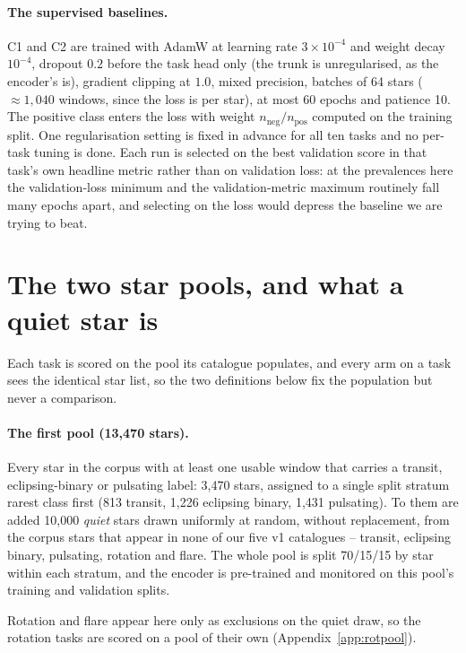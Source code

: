 \documentclass{article}
\begin{document}
\paragraph{The supervised baselines.} C1 and C2 are trained with AdamW at learning rate
$3\times10^{-4}$ and weight decay $10^{-4}$, dropout $0.2$ before the task head only (the trunk is
unregularised, as the encoder's is), gradient clipping at $1.0$, mixed precision, batches of 64
stars ($\approx 1{,}040$ windows, since the loss is per star), at most 60 epochs and patience 10.
The positive class enters the loss with weight $n_{\mathrm{neg}}/n_{\mathrm{pos}}$ computed on the
training split. One regularisation setting is fixed in advance for all ten tasks and no per-task
tuning is done. Each run is selected on the best validation score in that task's own headline metric
rather than on validation loss: at the prevalences here the validation-loss minimum and the
validation-metric maximum routinely fall many epochs apart, and selecting on the loss would depress
the baseline we are trying to beat.

\section{The two star pools, and what a quiet star is}
\label{app:pools}

Each task is scored on the pool its catalogue populates, and every arm on a task sees the identical
star list, so the two definitions below fix the population but never a comparison.

\paragraph{The first pool (13{,}470 stars).} Every star in the corpus with at least one usable window
that carries a transit, eclipsing-binary or pulsating label: 3{,}470 stars, assigned to a single
split stratum rarest class first (813 transit, 1{,}226 eclipsing binary, 1{,}431 pulsating). To them
are added 10{,}000 \emph{quiet} stars drawn uniformly at random, without replacement, from the corpus
stars that appear in none of our five v1 catalogues -- transit, eclipsing binary, pulsating, rotation
and flare. The whole pool is split 70/15/15 by star within each stratum, and the encoder is
pre-trained and monitored on this pool's training and validation splits.

Rotation and flare appear here only as exclusions on the quiet draw, so the rotation tasks are scored
on a pool of their own (Appendix~\ref{app:rotpool}).
\end{document}

